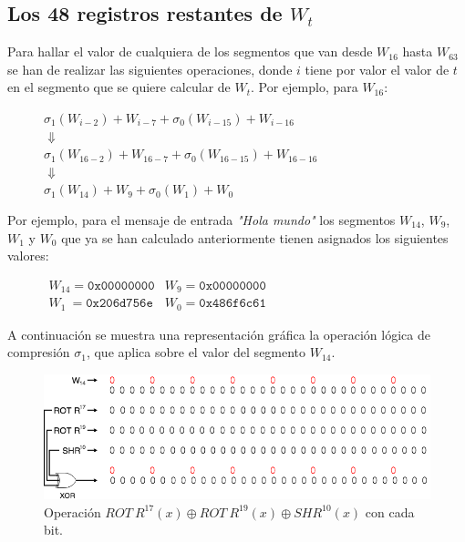 \documentclass{article}
\begin{document}
    \subsection{Los 48 registros restantes de $W_t$}
        Para hallar el valor de cualquiera de los segmentos que van desde $W_{16}$ hasta $W_{63}$ se han de realizar las siguientes operaciones, donde $i$ tiene por valor el valor de $t$ en el segmento que se quiere calcular de $W_t$. Por ejemplo, para $W_{16}$:
    
        \begin{figure}[H]
        \centering
            $\sigma_{1}(W_{i-2})+W_{i-7}+\sigma_{0}(W_{i-15})+W_{i-16}$ \\
            $\Downarrow$ \\
            $\sigma_{1}(W_{16-2})+W_{16-7}+\sigma_{0}(W_{16-15})+W_{16-16}$ \\
            $\Downarrow$ \\
            $\sigma_{1}(W_{14})+W_{9}+\sigma_{0}(W_{1})+W_{0}$
        \end{figure}
        
        Por ejemplo, para el mensaje de entrada \textit{"Hola mundo"} los segmentos $W_{14}$, $W_{9}$, $W_{1}$ y $W_{0}$ que ya se han calculado anteriormente tienen asignados los siguientes valores:
        
        \begin{figure}[H]
        \centering
            $\begin{array}{rl}
                W_{14} = \texttt{0x00000000} & W_{9} = \texttt{0x00000000} \\
                W_{1}\  = \texttt{0x206d756e} & W_{0} = \texttt{0x486f6c61}
            \end{array}$
        \end{figure}
        
        A continuación se muestra una representación gráfica la operación lógica de compresión $\sigma_{1}$, que aplica sobre el valor del segmento $W_{14}$.
        \begin{figure}[H]
        \centering
            \includegraphics[scale=0.445]{img/SHA-256-Wt_operation_sigma1.png}
            \caption{Operación $ROT \ R^{17}(x) \oplus ROT \ R^{19}(x) \oplus SHR^{10}(x)$ con cada bit.}
        \end{figure}
        
\end{document}
